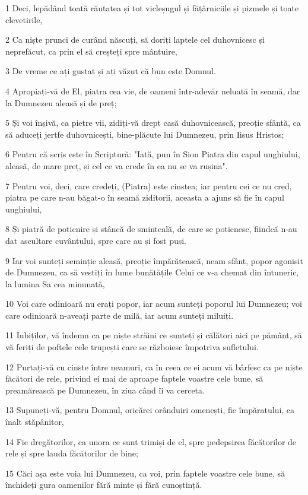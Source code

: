 \par 1 Deci, lepădând toată răutatea și tot vicleșugul și fățărniciile și pizmele și toate clevetirile,
\par 2 Ca niște prunci de curând născuți, să doriți laptele cel duhovnicesc și neprefăcut, ca prin el să creșteți spre mântuire,
\par 3 De vreme ce ați gustat și ați văzut că bun este Domnul.
\par 4 Apropiați-vă de El, piatra cea vie, de oameni într-adevăr neluată în seamă, dar la Dumnezeu aleasă și de preț;
\par 5 Și voi înșivă, ca pietre vii, zidiți-vă drept casă duhovnicească, preoție sfântă, ca să aduceți jertfe duhovnicești, bine-plăcute lui Dumnezeu, prin Iisus Hristos;
\par 6 Pentru că scris este în Scriptură: "Iată, pun în Sion Piatra din capul unghiului, aleasă, de mare preț, și cel ce va crede în ea nu se va rușina".
\par 7 Pentru voi, deci, care credeți, (Piatra) este cinstea; iar pentru cei ce nu cred, piatra pe care n-au băgat-o în seamă ziditorii, aceasta a ajuns să fie în capul unghiului,
\par 8 Și piatră de poticnire și stâncă de sminteală, de care se poticnesc, fiindcă n-au dat ascultare cuvântului, spre care au și fost puși.
\par 9 Iar voi sunteți seminție aleasă, preoție împărătească, neam sfânt, popor agonisit de Dumnezeu, ca să vestiți în lume bunătățile Celui ce v-a chemat din întuneric, la lumina Sa cea minunată,
\par 10 Voi care odinioară nu erați popor, iar acum sunteți poporul lui Dumnezeu; voi care odinioară n-aveați parte de milă, iar acum sunteți miluiți.
\par 11 Iubiților, vă îndemn ca pe niște străini ce sunteți și călători aici pe pământ, să vă feriți de poftele cele trupești care se războiesc împotriva sufletului.
\par 12 Purtați-vă cu cinste între neamuri, ca în ceea ce ei acum vă bârfesc ca pe niște făcători de rele, privind ei mai de aproape faptele voastre cele bune, să preamărească pe Dumnezeu, în ziua când îi va cerceta.
\par 13 Supuneți-vă, pentru Domnul, oricărei orânduiri omenești, fie împăratului, ca înalt stăpânitor,
\par 14 Fie dregătorilor, ca unora ce sunt trimiși de el, spre pedepsirea făcătorilor de rele și spre lauda făcătorilor de bine;
\par 15 Căci așa este voia lui Dumnezeu, ca voi, prin faptele voastre cele bune, să închideți gura oamenilor fără minte și fără cunoștință.
